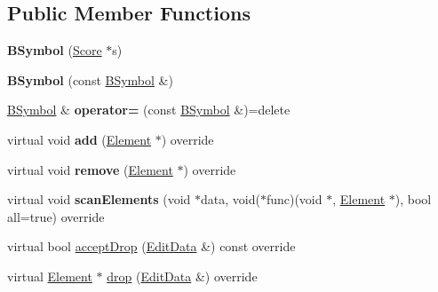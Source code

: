 \subsection*{Public Member Functions}
\begin{DoxyCompactItemize}
\item 
\mbox{\label{class_ms_1_1_b_symbol_a7ffcfcc81f672ab617288bd3c7473a4a}} 
{\bfseries B\+Symbol} (\hyperlink{class_ms_1_1_score}{Score} $\ast$s)
\item 
\mbox{\label{class_ms_1_1_b_symbol_ab21010108d898edddbd368c82571d68b}} 
{\bfseries B\+Symbol} (const \hyperlink{class_ms_1_1_b_symbol}{B\+Symbol} \&)
\item 
\mbox{\label{class_ms_1_1_b_symbol_a82f2355c6db77a970fe09952d7e96af5}} 
\hyperlink{class_ms_1_1_b_symbol}{B\+Symbol} \& {\bfseries operator=} (const \hyperlink{class_ms_1_1_b_symbol}{B\+Symbol} \&)=delete
\item 
\mbox{\label{class_ms_1_1_b_symbol_ae3dab198dc57e7c2472b5731c7da319e}} 
virtual void {\bfseries add} (\hyperlink{class_ms_1_1_element}{Element} $\ast$) override
\item 
\mbox{\label{class_ms_1_1_b_symbol_ab40121e9409c209054eaeaaf9b874742}} 
virtual void {\bfseries remove} (\hyperlink{class_ms_1_1_element}{Element} $\ast$) override
\item 
\mbox{\label{class_ms_1_1_b_symbol_ab7dfe9b5e2081f4641d0df7bfb048d79}} 
virtual void {\bfseries scan\+Elements} (void $\ast$data, void($\ast$func)(void $\ast$, \hyperlink{class_ms_1_1_element}{Element} $\ast$), bool all=true) override
\item 
virtual bool \hyperlink{class_ms_1_1_b_symbol_afaf2195aeb8f8d2352a593a3bc3cb2d4}{accept\+Drop} (\hyperlink{class_ms_1_1_edit_data}{Edit\+Data} \&) const override
\item 
virtual \hyperlink{class_ms_1_1_element}{Element} $\ast$ \hyperlink{class_ms_1_1_b_symbol_a88e83f2a4c92f2c1fcea20b2834f0a69}{drop} (\hyperlink{class_ms_1_1_edit_data}{Edit\+Data} \&) override
\item 
\mbox{\label{class_ms_1_1_b_symbol_a3cdbef553b0e4076e2a1d29c901bdea5}} 

\end{DoxyCompactItemize}
